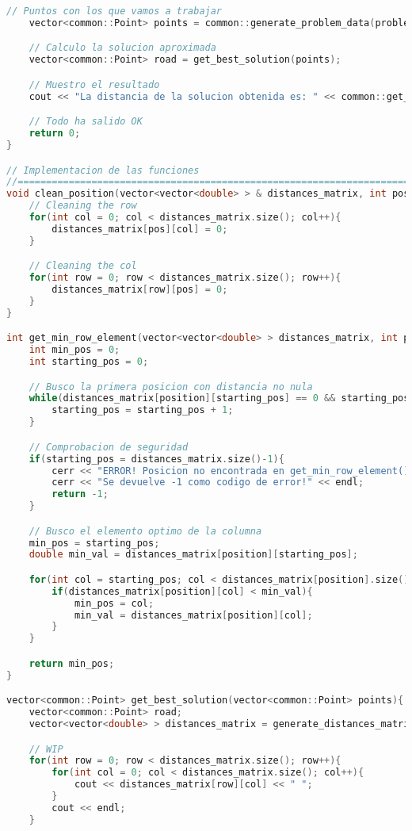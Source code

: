 \documentclass[10pt, a4paper]{article}
\theoremstyle{theorem-style}
\theoremstyle{theorem-style}
\theoremstyle{definition-style}
\theoremstyle{remark-style}
\theoremstyle{example-style}
\theoremstyle{definition-style}
\theoremstyle{remark-style}
\begin{document}
\begin{lstlisting}[language=C]
    // Puntos con los que vamos a trabajar
    vector<common::Point> points = common::generate_problem_data(problem_size);

    // Calculo la solucion aproximada
    vector<common::Point> road = get_best_solution(points);

    // Muestro el resultado
    cout << "La distancia de la solucion obtenida es: " << common::get_road_distance(road) << endl;

    // Todo ha salido OK
    return 0;
}

// Implementacion de las funciones 
//==============================================================================
void clean_position(vector<vector<double> > & distances_matrix, int pos){
    // Cleaning the row
    for(int col = 0; col < distances_matrix.size(); col++){
        distances_matrix[pos][col] = 0;
    }

    // Cleaning the col
    for(int row = 0; row < distances_matrix.size(); row++){
        distances_matrix[row][pos] = 0;
    }
}

int get_min_row_element(vector<vector<double> > distances_matrix, int position){
    int min_pos = 0;
    int starting_pos = 0;

    // Busco la primera posicion con distancia no nula
    while(distances_matrix[position][starting_pos] == 0 && starting_pos < distances_matrix.size()){
        starting_pos = starting_pos + 1;
    }

    // Comprobacion de seguridad
    if(starting_pos = distances_matrix.size()-1){
        cerr << "ERROR! Posicion no encontrada en get_min_row_element()" << endl;
        cerr << "Se devuelve -1 como codigo de error!" << endl;
        return -1;
    }

    // Busco el elemento optimo de la columna
    min_pos = starting_pos;
    double min_val = distances_matrix[position][starting_pos];

    for(int col = starting_pos; col < distances_matrix[position].size(); col++){
        if(distances_matrix[position][col] < min_val){
            min_pos = col;
            min_val = distances_matrix[position][col];
        }
    }

    return min_pos;
}

vector<common::Point> get_best_solution(vector<common::Point> points){
    vector<common::Point> road;
    vector<vector<double> > distances_matrix = generate_distances_matrix(points);

    // WIP
    for(int row = 0; row < distances_matrix.size(); row++){
        for(int col = 0; col < distances_matrix.size(); col++){
            cout << distances_matrix[row][col] << " ";
        }
        cout << endl;
    }
 

\end{lstlisting}
\end{document}
